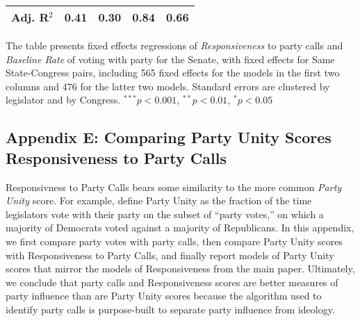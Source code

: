 \documentclass[12pt]{article}
\begin{document}
\begin{table}[!htbp]
\begin{threeparttable}
\begin{tabular}{l c c c c }
Adj. R$^2$%
                                  & 0.41        & 0.30     & 0.84        & 0.66         \\
\hline
\end{tabular}
\begin{tablenotes}
   \item
   The table presents fixed effects regressions of \textit{Responsiveness} to party calls and \textit {Baseline Rate} of voting with party for the Senate, with fixed effects for Same State-Congress pairs, including 565 fixed effects for the models in the first two columns and 476 for the latter two models.  Standard errors are clustered by legislator and by Congress.
   $^{***}p<0.001$, $^{**}p<0.01$, $^*p<0.05$
 \end{tablenotes}
\end{threeparttable}
\end{table}

\clearpage


\subsection*{Appendix E: Comparing Party Unity Scores Responsiveness to Party Calls}
%

Responsivness to Party Calls bears some similarity to the more common
\emph{Party Unity} score.
For example, \cite{Carson:2010} define Party Unity as the fraction of the time
legislators vote with their party on the subset of ``party votes,'' on which a
majority of Democrats voted against a majority of Republicans.
In this appendix, we first compare party votes with party calls, then compare
Party Unity scores with Responsiveness to Party Calls, and finally report
models of Party Unity scores that mirror the models of Responsiveness from the
main paper.
Ultimately, we conclude that party calls and Responsiveness scores are
better measures of party influence than are Party Unity scores because the
algorithm used to identify party calls is purpose-built to separate party
influence from ideology.
\end{document}
